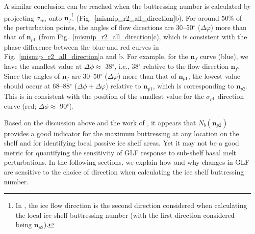 \documentclass[tc, manuscript]{copernicus}
\begin{document}
A similar conclusion can be reached when the buttressing number is calculated by projecting $\sigma_{nn}$ onto $\mathbf{n}_{f}$\footnote{In \citet{furst2016}, the ice flow direction is the second direction considered when calculating the local ice shelf buttressing number (with the first direction considered being $\mathbf{n}_{p2}$).} (Fig.~\ref{mismip_r2_all_direction}b).
For around 50\% of the perturbation points, the angles of flow directions are 30--50$^\circ$ ($\Delta\varphi$) more than that of $\mathbf{n}_{p1}$ (from Fig.~\ref{mismip_r2_all_direction}c), which is consistent with the phase difference between the blue and red curves in Fig.~\ref{mismip_r2_all_direction}a and b. For example, for the $\mathbf{n}_{f}$ curve (blue), we have the smallest value at $\Delta\phi\approx$ 38$^\circ$, i.e., 38$^\circ$ relative to the flow direction $\mathbf{n}_{f}$. Since the angles of $\mathbf{n}_{f}$ are 30--50$^\circ$ ($\Delta\varphi$) more than that of $\mathbf{n}_{p1}$, the lowest value should occur at 68--88$^\circ$ ($\Delta\phi+\Delta\varphi$) relative to $\mathbf{n}_{p1}$, which is corresponding to $\mathbf{n}_{p2}$. This is in consistent with the position of the smallest value for the $\sigma_{p1}$ direction curve (red; $\Delta\phi\approx$ 90$^\circ$). %


Based on the discussion above and the work of \citet{furst2016}, it appears that $N_b(\mathbf{n}_{p2})$ provides a good indicator for the maximum buttressing at any location on the shelf and for identifying local passive ice shelf areas. Yet it may not be a good metric for quantifying the sensitivity of GLF response to sub-shelf basal melt perturbations. In the following sections, we explain how and why changes in GLF are sensitive to the choice of direction when calculating the ice shelf buttressing number. 
\end{document}
